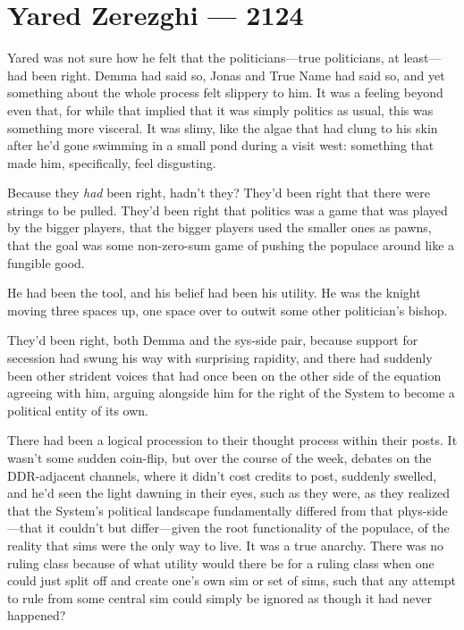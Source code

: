 \hypertarget{yared-zerezghi-2124}{%
\chapter{Yared Zerezghi — 2124}\label{yared-zerezghi-2124}}

Yared was not sure how he felt that the politicians---true politicians, at least---had been right. Demma had said so, Jonas and True Name had said so, and yet something about the whole process felt slippery to him. It was a feeling beyond even that, for while that implied that it was simply politics as usual, this was something more visceral. It was slimy, like the algae that had clung to his skin after he'd gone swimming in a small pond during a visit west: something that made him, specifically, feel disgusting.

Because they \emph{had} been right, hadn't they? They'd been right that there were strings to be pulled. They'd been right that politics was a game that was played by the bigger players, that the bigger players used the smaller ones as pawns, that the goal was some non-zero-sum game of pushing the populace around like a fungible good.

He had been the tool, and his belief had been his utility. He was the knight moving three spaces up, one space over to outwit some other politician's bishop.

They'd been right, both Demma and the sys-side pair, because support for secession had swung his way with surprising rapidity, and there had suddenly been other strident voices that had once been on the other side of the equation agreeing with him, arguing alongside him for the right of the System to become a political entity of its own.

There had been a logical procession to their thought process within their posts. It wasn't some sudden coin-flip, but over the course of the week, debates on the DDR-adjacent channels, where it didn't cost credits to post, suddenly swelled, and he'd seen the light dawning in their eyes, such as they were, as they realized that the System's political landscape fundamentally differed from that phys-side---that it couldn't but differ---given the root functionality of the populace, of the reality that sims were the only way to live. It was a true anarchy. There was no ruling class because of what utility would there be for a ruling class when one could just split off and create one's own sim or set of sims, such that any attempt to rule from some central sim could simply be ignored as though it had never happened?

